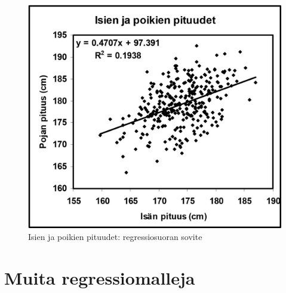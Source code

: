 \documentclass[
]{book}
\begin{document}
\begin{figure}

{\centering \includegraphics[width=1\linewidth]{images/Sovite-isien-poikien-pituudet-Mellin} 

}

\caption{Isien ja poikien pituudet: regressiosuoran sovite}\label{fig:isatjapojat2}
\end{figure}

\hfill\break

\hypertarget{alaluku103}{%
\section{Muita regressiomalleja}\label{alaluku103}}
\end{document}
